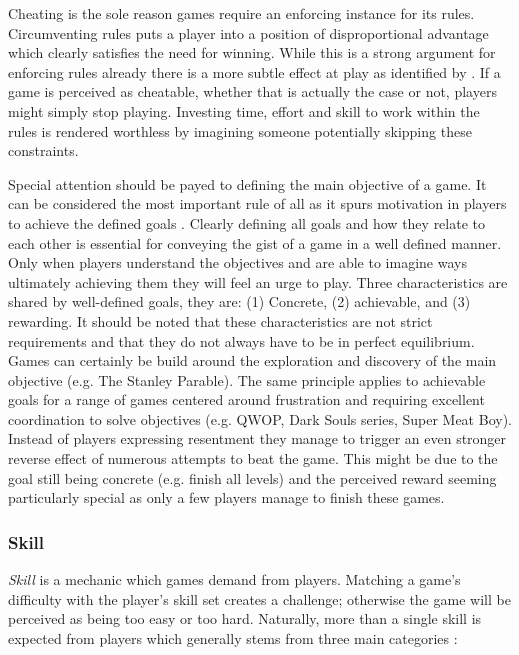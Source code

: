 Cheating is the sole reason games require an enforcing instance for its rules.
Circumventing rules puts a player into a position of disproportional advantage which clearly satisfies the need for winning.
While this is a strong argument for enforcing rules already there is a more subtle effect at play as identified by \citeauthor{Schell2014}.
If a game is perceived as cheatable, whether that is actually the case or not, players might simply stop playing.
Investing time, effort and skill to work within the rules is rendered worthless by imagining someone potentially skipping these constraints.

Special attention should be payed to defining the main objective of a game. 
It can be considered the most important rule of all as it spurs motivation in players to achieve the defined goals \cite{Schell2014}.
Clearly defining all goals and how they relate to each other is essential for conveying the gist of a game in a well defined manner.
Only when players understand the objectives and are able to imagine ways ultimately achieving them they will feel an urge to play.
Three characteristics are shared by well-defined goals, they are: (1) Concrete, (2) achievable, and (3) rewarding.
It should be noted that these characteristics are not strict requirements and that they do not always have to be in perfect equilibrium.
Games can certainly be build around the exploration and discovery of the main objective (e.g. The Stanley Parable).
The same principle applies to achievable goals for a range of games centered around frustration and requiring excellent coordination to solve objectives (e.g. QWOP, Dark Souls series, Super Meat Boy).
Instead of players expressing resentment they manage to trigger an even stronger reverse effect of numerous attempts to beat the game.
This might be due to the goal still being concrete (e.g. finish all levels) and the perceived reward seeming particularly special as only a few players manage to finish these games.

\subsubsection{Skill} \label{sec:skill}
\textit{Skill} is a mechanic which games demand from players.
Matching a game's difficulty with the player's skill set creates a challenge; otherwise the game will be perceived as being too easy or too hard.
Naturally, more than a single skill is expected from players which generally stems from three main categories \cite{Schell2014}:

